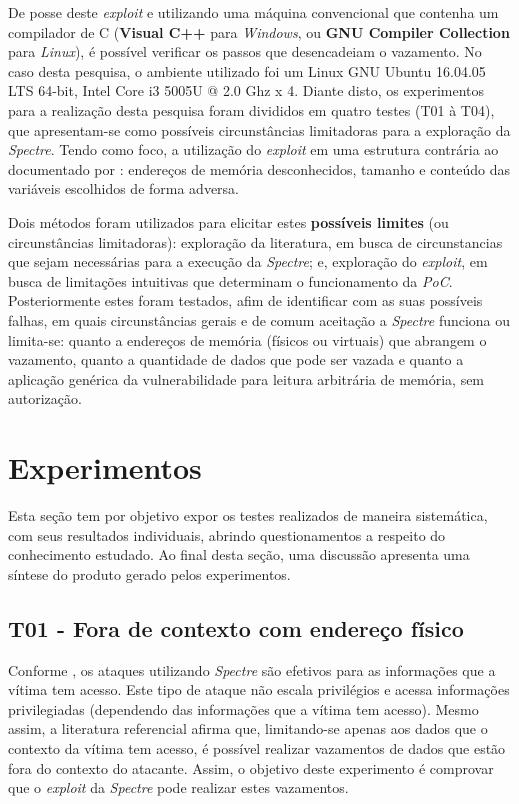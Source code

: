 \documentclass[conference]{IEEEtran}
\begin{document}
De posse deste \emph{exploit} e utilizando uma máquina convencional que contenha um compilador de C (\textbf{Visual C++} para \emph{Windows}, ou \textbf{GNU Compiler Collection} para \emph{Linux}), é possível verificar os passos que desencadeiam o vazamento. No caso desta pesquisa, o ambiente utilizado foi um Linux GNU Ubuntu 16.04.05 LTS 64-bit, Intel\textsuperscript{\tiny\textregistered} Core\textsuperscript{\tiny\texttrademark} i3 5005U @ 2.0 Ghz x 4. Diante disto, os experimentos para a realização desta pesquisa foram divididos em quatro testes (T01 à T04), que apresentam-se como possíveis circunstâncias limitadoras para a exploração da \emph{Spectre}. Tendo como foco, a utilização do \emph{exploit} em uma estrutura contrária ao documentado por : endereços de memória desconhecidos, tamanho e conteúdo das variáveis escolhidos de forma adversa.

Dois métodos foram utilizados para elicitar estes \textbf{possíveis limites} (ou circunstâncias limitadoras): exploração da literatura, em busca de circunstancias que sejam necessárias para a execução da \emph{Spectre}; e, exploração do \emph{exploit}, em busca de limitações intuitivas que determinam o funcionamento da \emph{PoC}. Posteriormente estes foram testados, afim de identificar com as suas possíveis falhas, em quais circunstâncias gerais e de comum aceitação a \emph{Spectre} funciona ou limita-se: quanto a endereços de memória (físicos ou virtuais) que abrangem o vazamento, quanto a quantidade de dados que pode ser vazada e quanto a aplicação genérica da vulnerabilidade para leitura arbitrária de memória, sem autorização.

\section{Experimentos}
Esta seção tem por objetivo expor os testes realizados de maneira sistemática, com seus resultados individuais, abrindo questionamentos a respeito do conhecimento estudado. Ao final desta seção, uma discussão apresenta uma síntese do produto gerado pelos experimentos.
\subsection{T01 - Fora de contexto com endereço físico}
Conforme , os ataques utilizando \emph{Spectre} são efetivos para as informações que a vítima tem acesso. Este tipo de ataque não escala privilégios e acessa informações privilegiadas (dependendo das informações que a vítima tem acesso). Mesmo assim, a literatura referencial afirma que, limitando-se apenas aos dados que o contexto da vítima tem acesso, é possível realizar vazamentos de dados que estão fora do contexto do atacante. Assim, o objetivo deste experimento é comprovar que o \emph{exploit} da \emph{Spectre} pode realizar estes vazamentos.
\end{document}
